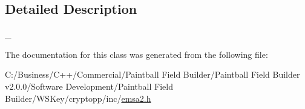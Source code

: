 \subsection{Detailed Description}
\_\- 

The documentation for this class was generated from the following file:\begin{DoxyCompactItemize}
\item 
C:/Business/C++/Commercial/Paintball Field Builder/Paintball Field Builder v2.0.0/Software Development/Paintball Field Builder/WSKey/cryptopp/inc/\hyperlink{emsa2_8h}{emsa2.h}\end{DoxyCompactItemize}
